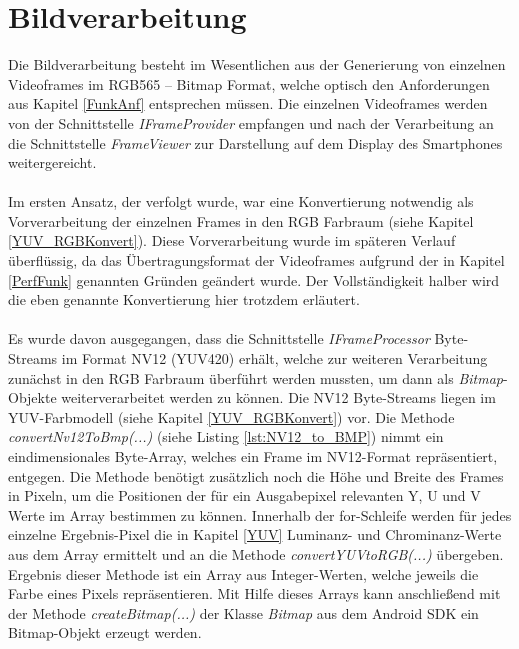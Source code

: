 \chapter{Bildverarbeitung} \label{chap:Bildverarbeitung}

Die Bildverarbeitung besteht im Wesentlichen aus der Generierung von einzelnen Videoframes im RGB565 – Bitmap Format, welche optisch den Anforderungen aus Kapitel \ref{FunkAnf} entsprechen müssen. Die einzelnen Videoframes werden von der Schnittstelle \textit{IFrameProvider} empfangen und nach der Verarbeitung an die Schnittstelle \textit{FrameViewer} zur Darstellung auf dem Display des Smartphones weitergereicht.
\\
\\
Im ersten Ansatz, der verfolgt wurde, war eine Konvertierung notwendig als Vorverarbeitung der einzelnen Frames in den RGB Farbraum (siehe Kapitel \ref{YUV_RGBKonvert}). Diese Vorverarbeitung wurde im späteren Verlauf überflüssig, da das Übertragungsformat der Videoframes aufgrund der in Kapitel \ref{PerfFunk} genannten Gründen geändert wurde. Der Vollständigkeit halber wird die eben genannte Konvertierung hier trotzdem erläutert.
\\
\\
Es wurde davon ausgegangen, dass die Schnittstelle \textit{IFrameProcessor} Byte-Streams im Format NV12 (YUV420) erhält, welche zur weiteren Verarbeitung zunächst in den RGB Farbraum überführt werden mussten, um dann als \textit{Bitmap}-Objekte weiterverarbeitet werden zu können. Die NV12 Byte-Streams liegen im YUV-Farbmodell (siehe Kapitel \ref{YUV_RGBKonvert}) vor. Die Methode \textit{convertNv12ToBmp(...)} (siehe Listing \ref{lst:NV12_to_BMP}) nimmt ein eindimensionales Byte-Array, welches ein Frame im NV12-Format repräsentiert, entgegen. Die Methode benötigt zusätzlich noch die Höhe und Breite des Frames in Pixeln, um die Positionen der für ein Ausgabepixel relevanten Y, U und V Werte im Array bestimmen zu können. Innerhalb der for-Schleife werden für jedes einzelne Ergebnis-Pixel die in Kapitel \ref{YUV} Luminanz- und Chrominanz-Werte aus dem Array ermittelt und an die Methode \textit{convertYUVtoRGB(...)} übergeben. Ergebnis dieser Methode ist ein Array aus Integer-Werten, welche jeweils die Farbe eines Pixels repräsentieren. Mit Hilfe dieses Arrays kann anschließend mit der Methode \textit{createBitmap(...)} der Klasse \textit{Bitmap} aus dem Android SDK ein Bitmap-Objekt erzeugt werden. 
\clearpage

